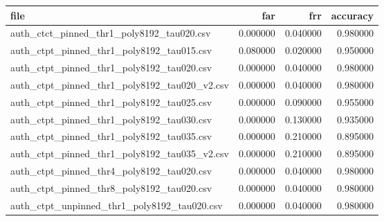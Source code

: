 \begin{tabular}{lrrr}
\toprule
file & far & frr & accuracy \\
\midrule
auth_ctct_pinned_thr1_poly8192_tau020.csv & 0.000000 & 0.040000 & 0.980000 \\
auth_ctpt_pinned_thr1_poly8192_tau015.csv & 0.080000 & 0.020000 & 0.950000 \\
auth_ctpt_pinned_thr1_poly8192_tau020.csv & 0.000000 & 0.040000 & 0.980000 \\
auth_ctpt_pinned_thr1_poly8192_tau020_v2.csv & 0.000000 & 0.040000 & 0.980000 \\
auth_ctpt_pinned_thr1_poly8192_tau025.csv & 0.000000 & 0.090000 & 0.955000 \\
auth_ctpt_pinned_thr1_poly8192_tau030.csv & 0.000000 & 0.130000 & 0.935000 \\
auth_ctpt_pinned_thr1_poly8192_tau035.csv & 0.000000 & 0.210000 & 0.895000 \\
auth_ctpt_pinned_thr1_poly8192_tau035_v2.csv & 0.000000 & 0.210000 & 0.895000 \\
auth_ctpt_pinned_thr4_poly8192_tau020.csv & 0.000000 & 0.040000 & 0.980000 \\
auth_ctpt_pinned_thr8_poly8192_tau020.csv & 0.000000 & 0.040000 & 0.980000 \\
auth_ctpt_unpinned_thr1_poly8192_tau020.csv & 0.000000 & 0.040000 & 0.980000 \\
\bottomrule
\end{tabular}
